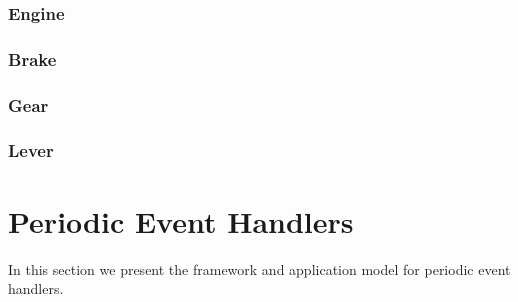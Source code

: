 \documentclass{article}
\begin{document}
\subsubsection{Engine}

\begin{circusbox}

\end{circusbox}

\subsubsection{Brake}

\begin{circusbox}

\end{circusbox}

\subsubsection{Gear}

\begin{circusbox}

\end{circusbox}

\subsubsection{Lever}

\begin{circusbox}

\end{circusbox}

\newpage


\section{Periodic Event Handlers}

In this section we present the framework and application model for periodic event handlers.


%
\end{document}

